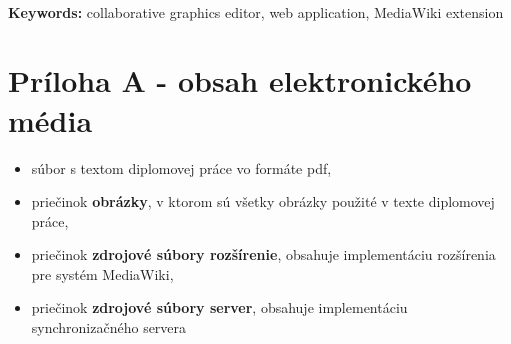 \documentclass[12pt, a4paper, oneside]{book}
\begin{document}
~\\
\textbf{Keywords:} collaborative graphics editor, web application, MediaWiki extension
\vfill\eject 


\setlength{\parskip}{0em}
\tableofcontents

\setlength{\parskip}{\spaceafterpar}


\mainmatter









\backmatter
\def\spaceafterpar{0em}
\setlength{\parskip}{\spaceafterpar}
\listoffigures

\listoftables



\nocite{*}



\chapter*{Príloha A - obsah elektronického média}
\begin{itemize}
	\item súbor s textom diplomovej práce vo formáte pdf,
	\item priečinok \textbf{obrázky}, v ktorom sú všetky obrázky použité v texte diplomovej práce,
	\item priečinok \textbf{zdrojové súbory rozšírenie}, obsahuje implementáciu rozšírenia pre systém MediaWiki,
		\item priečinok \textbf{zdrojové súbory server}, obsahuje implementáciu synchronizačného servera
\end{itemize}
\end{document}
